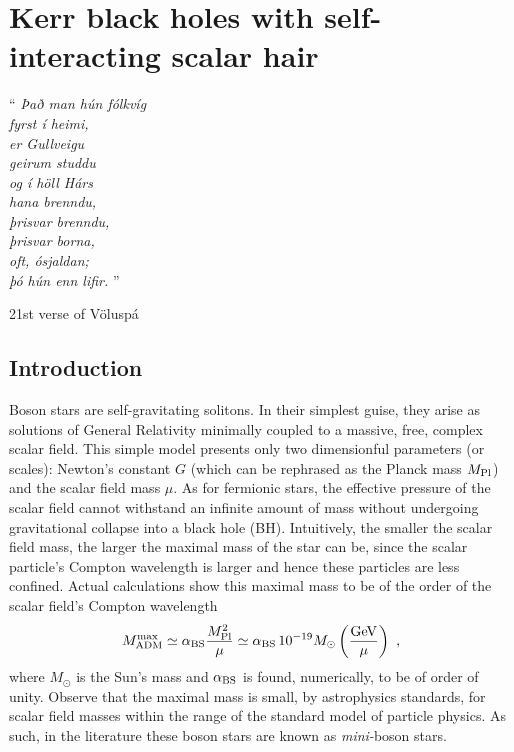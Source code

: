 \chapter{Kerr black holes with self-interacting scalar hair}
\label{ch:SI}

\epigraph{``\emph{
Það man hún fólkvíg \\
fyrst í heimi, \\
er Gullveigu \\
geirum studdu \\
og í höll Hárs \\
hana brenndu, \\
þrisvar brenndu, \\
þrisvar borna, \\
oft, ósjaldan; \\
þó hún enn lifir. 
} 
''}{21st verse of Völuspá}


\section{Introduction}
Boson stars are self-gravitating solitons.
In their simplest guise, they arise as solutions of General Relativity minimally coupled to a massive, free, complex scalar field\cite{Kaup:1968zz,Ruffini:1969qy}.
This simple model presents only two dimensionful parameters (or scales): Newton's constant $G$ (which can be rephrased as the Planck mass $M_{\rm Pl}$) and the scalar field mass $\mu$.
As for fermionic stars, the effective pressure of the scalar field cannot withstand an infinite amount of mass without undergoing gravitational collapse into a black hole (BH).
Intuitively, the smaller the scalar field mass, the larger the maximal mass of the star can be, since the scalar particle's Compton wavelength is larger and hence these particles are less confined. 
Actual calculations show this maximal mass to be of the order of the scalar field's Compton wavelength
\begin{equation}
 M_{\rm ADM}^{\rm max}\simeq \alpha_{\rm BS} \frac{M_{\rm Pl}^2}{\mu}\simeq \alpha_{\rm BS} \, 10^{-19}M_\odot\left(\frac{\rm GeV}{\mu}\right)\ , 
\label{mini}
\end{equation}
where $M_{\odot}$ is the Sun's mass and $\alpha_{\rm BS}$ is found, numerically, to be of order of unity.
Observe that the maximal mass is small, by astrophysics standards, for scalar field masses within the range of the standard model of particle physics.
As such, in the literature these boson stars are known as \textit{mini-}boson stars\cite{Schunck:2003kk}. 

